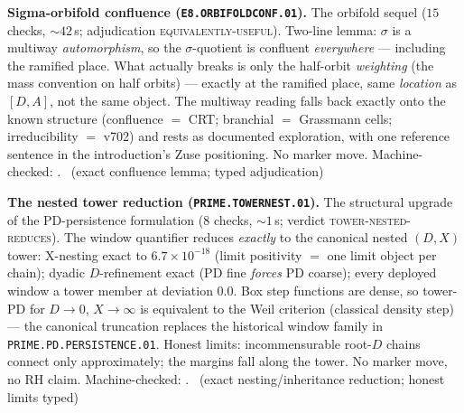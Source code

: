 \par\smallskip\noindent\textbf{Sigma-orbifold confluence
(\texttt{E8.ORBIFOLDCONF.01}).}
The orbifold sequel ($15$ checks, ${\sim}42$\,s; adjudication
\textsc{equivalently-useful}).  Two-line lemma: $\sigma$ is a
multiway \emph{automorphism}, so the $\sigma$-quotient is confluent
\emph{everywhere} --- including the ramified place.  What actually
breaks is only the half-orbit \emph{weighting} (the mass convention
on half orbits) --- exactly at the ramified place, same
\emph{location} as $[D,A]$, not the same object.  The multiway
reading falls back exactly onto the known structure (confluence $=$
CRT; branchial $=$ Grassmann cells; irreducibility $=$ v702) and
rests as documented exploration, with one reference sentence in the
introduction's Zuse positioning.  No marker move.
Machine-checked:
.
\mE\ (exact confluence lemma; typed adjudication)
\par\smallskip


\par\smallskip\noindent\textbf{The nested tower reduction
(\texttt{PRIME.TOWERNEST.01}).}
The structural upgrade of the PD-persistence formulation ($8$
checks, ${\sim}1$\,s; verdict \textsc{tower-nested-reduces}).  The
window quantifier reduces \emph{exactly} to the canonical nested
$(D,X)$ tower: X-nesting exact to $6.7\times10^{-18}$ (limit
positivity $=$ one limit object per chain); dyadic $D$-refinement
exact (PD fine \emph{forces} PD coarse); every deployed window a
tower member at deviation $0.0$.  Box step functions are dense, so
tower-PD for $D\to0$, $X\to\infty$ is equivalent to the Weil
criterion (classical density step) --- the canonical truncation
replaces the historical window family in
\texttt{PRIME.PD.PERSISTENCE.01}.  Honest limits: incommensurable
root-$D$ chains connect only approximately; the margins fall along
the tower.  No marker move, no RH claim.
Machine-checked: .
\mE\ (exact nesting/inheritance reduction; honest limits typed)
\par\smallskip


